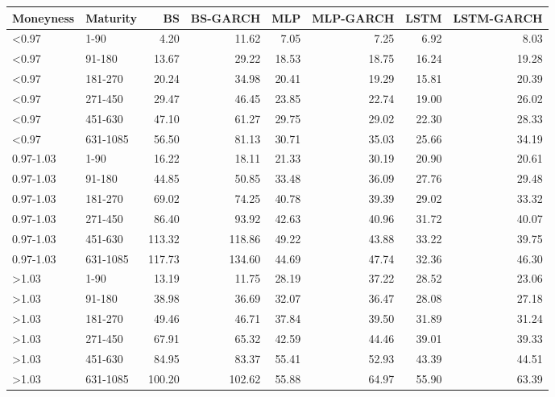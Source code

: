 \begin{tabular}{llrrrrrr}
\toprule
Moneyness & Maturity & BS & BS-GARCH & MLP & MLP-GARCH & LSTM & LSTM-GARCH \\
\midrule
<0.97 & 1-90 & 4.20 & 11.62 & 7.05 & 7.25 & 6.92 & 8.03 \\
<0.97 & 91-180 & 13.67 & 29.22 & 18.53 & 18.75 & 16.24 & 19.28 \\
<0.97 & 181-270 & 20.24 & 34.98 & 20.41 & 19.29 & 15.81 & 20.39 \\
<0.97 & 271-450 & 29.47 & 46.45 & 23.85 & 22.74 & 19.00 & 26.02 \\
<0.97 & 451-630 & 47.10 & 61.27 & 29.75 & 29.02 & 22.30 & 28.33 \\
<0.97 & 631-1085 & 56.50 & 81.13 & 30.71 & 35.03 & 25.66 & 34.19 \\
0.97-1.03 & 1-90 & 16.22 & 18.11 & 21.33 & 30.19 & 20.90 & 20.61 \\
0.97-1.03 & 91-180 & 44.85 & 50.85 & 33.48 & 36.09 & 27.76 & 29.48 \\
0.97-1.03 & 181-270 & 69.02 & 74.25 & 40.78 & 39.39 & 29.02 & 33.32 \\
0.97-1.03 & 271-450 & 86.40 & 93.92 & 42.63 & 40.96 & 31.72 & 40.07 \\
0.97-1.03 & 451-630 & 113.32 & 118.86 & 49.22 & 43.88 & 33.22 & 39.75 \\
0.97-1.03 & 631-1085 & 117.73 & 134.60 & 44.69 & 47.74 & 32.36 & 46.30 \\
>1.03 & 1-90 & 13.19 & 11.75 & 28.19 & 37.22 & 28.52 & 23.06 \\
>1.03 & 91-180 & 38.98 & 36.69 & 32.07 & 36.47 & 28.08 & 27.18 \\
>1.03 & 181-270 & 49.46 & 46.71 & 37.84 & 39.50 & 31.89 & 31.24 \\
>1.03 & 271-450 & 67.91 & 65.32 & 42.59 & 44.46 & 39.01 & 39.33 \\
>1.03 & 451-630 & 84.95 & 83.37 & 55.41 & 52.93 & 43.39 & 44.51 \\
>1.03 & 631-1085 & 100.20 & 102.62 & 55.88 & 64.97 & 55.90 & 63.39 \\
\bottomrule
\end{tabular}
